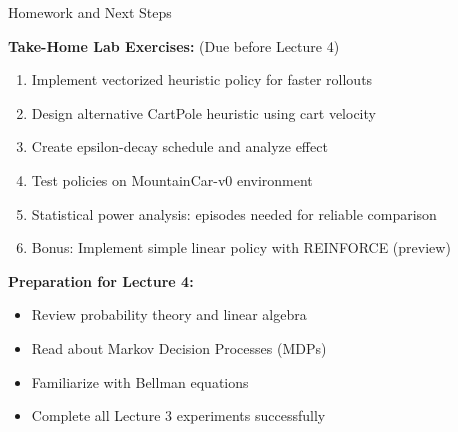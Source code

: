 \documentclass[aspectratio=169,10pt]{beamer}
\begin{document}
\begin{frame}{Homework and Next Steps}

\textbf{Take-Home Lab Exercises:} (Due before Lecture 4)

\begin{enumerate}
    \item Implement vectorized heuristic policy for faster rollouts
    \item Design alternative CartPole heuristic using cart velocity
    \item Create epsilon-decay schedule and analyze effect
    \item Test policies on MountainCar-v0 environment  
    \item Statistical power analysis: episodes needed for reliable comparison
    \item Bonus: Implement simple linear policy with REINFORCE (preview)
\end{enumerate}

\vfill

\textbf{Preparation for Lecture 4:}
\begin{itemize}
    \item Review probability theory and linear algebra
    \item Read about Markov Decision Processes (MDPs)
    \item Familiarize with Bellman equations
    \item Complete all Lecture 3 experiments successfully
\end{itemize}

\end{frame}
\end{document}
